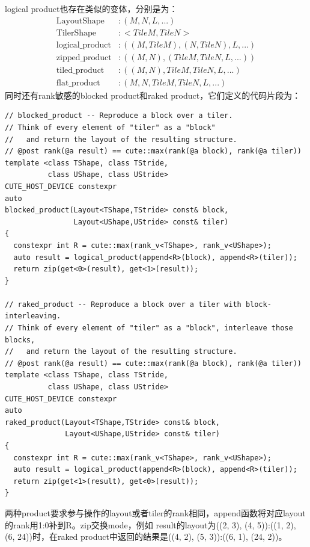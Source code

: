 \documentclass[a4paper,12pt]{ctexart}
\numberwithin{equation}{section}
\begin{document}
logical product也存在类似的变体，分别是为：
\begin{equation}
  \begin{aligned}
    \mathrm{Layout Shape}     & : (M, N, L, ...)                 \\
    \mathrm{Tiler Shape}      & : <TileM, TileN>                 \\
    \mathrm{logical\_product} & : ((M,TileM), (N,TileN), L, ...) \\
    \mathrm{zipped\_product}  & : ((M,N), (TileM,TileN,L,...))   \\
    \mathrm{tiled\_product}   & : ((M,N), TileM, TileN, L, ...)  \\
    \mathrm{flat\_product}    & : (M, N, TileM, TileN, L, ...)
  \end{aligned}
\end{equation}
同时还有rank敏感的blocked product和raked product，它们定义的代码片段为：
\begin{verbatim}
// blocked_product -- Reproduce a block over a tiler.
// Think of every element of "tiler" as a "block"
//   and return the layout of the resulting structure.
// @post rank(@a result) == cute::max(rank(@a block), rank(@a tiler))
template <class TShape, class TStride,
          class UShape, class UStride>
CUTE_HOST_DEVICE constexpr
auto
blocked_product(Layout<TShape,TStride> const& block,
                Layout<UShape,UStride> const& tiler)
{
  constexpr int R = cute::max(rank_v<TShape>, rank_v<UShape>);
  auto result = logical_product(append<R>(block), append<R>(tiler));
  return zip(get<0>(result), get<1>(result));
}

// raked_product -- Reproduce a block over a tiler with block-interleaving.
// Think of every element of "tiler" as a "block", interleave those blocks,
//   and return the layout of the resulting structure.
// @post rank(@a result) == cute::max(rank(@a block), rank(@a tiler))
template <class TShape, class TStride,
          class UShape, class UStride>
CUTE_HOST_DEVICE constexpr
auto
raked_product(Layout<TShape,TStride> const& block,
              Layout<UShape,UStride> const& tiler)
{
  constexpr int R = cute::max(rank_v<TShape>, rank_v<UShape>);
  auto result = logical_product(append<R>(block), append<R>(tiler));
  return zip(get<1>(result), get<0>(result));
}
\end{verbatim}
两种product要求参与操作的layout或者tiler的rank相同，append函数将对应layout的rank用1:0补到R。zip交换mode，例如
result的layout为((2, 3), (4, 5)):((1, 2), (6, 24))时，在raked product中返回的结果是((4, 2), (5, 3)):((6, 1), (24, 2))。
\end{document}
